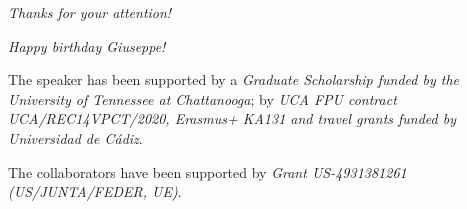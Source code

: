 \begin{frame}{}
	\centering
	\vspace*{1cm}
	{\Huge
		\emph{Thanks for your attention!}}
	
	\vspace*{0.5cm}
	\emph{Happy birthday Giuseppe!}
	
	\vspace*{1cm}
	\begin{acknowledgements}
		The speaker has been supported by a \textit{Graduate Scholarship funded by the University of Tennessee at Chattanooga}; by \textit{UCA FPU contract UCA/REC14VPCT/2020, Erasmus+ KA131 and travel grants funded by Universidad de Cádiz}.
		
		The collaborators have been supported by \textit{Grant US-4931381261 (US/JUNTA/FEDER, UE)}.
	\end{acknowledgements}
\end{frame}